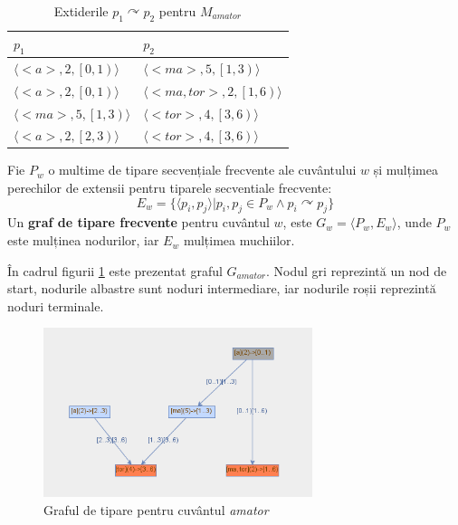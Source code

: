 \begin{table}[h!]
\centering    
\begin{tabular}{|l|l|}    
\hline      
$p_1$ & $p_2$\\
\hline
$\langle<a>, 2, \left[0,1\right)\rangle$ & $\langle<ma>, 5, \left[1,3\right)\rangle$  \\
$\langle<a>, 2, \left[0,1\right)\rangle$ & $\langle<ma,tor>, 2, \left[1,6\right)\rangle$  \\
$\langle<ma>, 5, \left[1,3\right)\rangle$ & $\langle<tor>, 4, \left[3,6\right)\rangle$  \\
$\langle<a>, 2, \left[2,3\right)\rangle$ & $\langle<tor>, 4, \left[3,6\right)\rangle$  \\
\hline
\end{tabular}
\caption{Extiderile $p_1 \curvearrowright p_2$ pentru $M_{amator}$}
\label{table:sdb_pattern_extensions}               
\end{table}  

\begin{defi}
Fie $P_w$ o multime de tipare secvențiale frecvente ale cuvântului $w$ și mulțimea perechilor de extensii pentru tiparele secventiale frecvente: 
\begin{equation}
E_w = \{\langle p_i, p_j \rangle \vert p_i,p_j \in P_w \wedge p_i \curvearrowright p_j\}
\end{equation}
Un \textbf{graf de tipare frecvente} pentru cuvântul $w$, este $G_w = \langle P_w, E_w \rangle$, unde $P_w$ este mulținea nodurilor, iar $E_w$ mulțimea muchiilor. 
\end{defi}

\begin{ex}
În cadrul figurii \ref{fig:rosil-amator} este prezentat graful $G_{amator}$. Nodul gri reprezintă un nod de start, nodurile albastre sunt noduri intermediare, iar nodurile roșii reprezintă noduri terminale. 
\end{ex}

\begin{figure}[h!]
    \centering
    \includegraphics[width=0.7\textwidth]{figures/rosil-amator.png}
    \caption{Graful de tipare pentru cuvântul \textit{amator}}
    \label{fig:rosil-amator}
\end{figure}

